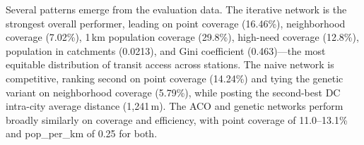 \documentclass[sigconf,nonacm]{acmart}
\begin{document}
\begin{table}[h]
\caption{Equity and Population Coverage}
\label{tab:eval_equity}
\end{table}

\begin{table}[h]
\caption{Service Efficiency and Transfer Burden}
\label{tab:eval_efficiency}
\end{table}

Several patterns emerge from the evaluation data. The iterative network is the strongest overall performer, leading on point coverage (16.46\%), neighborhood coverage (7.02\%), 1\,km population coverage (29.8\%), high-need coverage (12.8\%), population in catchments (0.0213), and Gini coefficient (0.463)---the most equitable distribution of transit access across stations. The naive network is competitive, ranking second on point coverage (14.24\%) and tying the genetic variant on neighborhood coverage (5.79\%), while posting the second-best DC intra-city average distance (1,241\,m). The ACO and genetic networks perform broadly similarly on coverage and efficiency, with point coverage of 11.0--13.1\% and pop\_per\_km of 0.25 for both.
\end{document}
